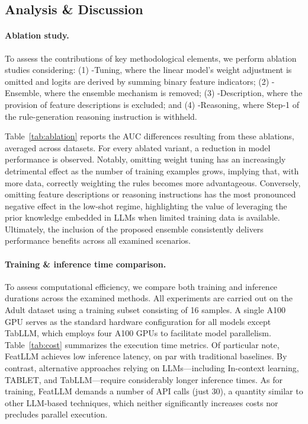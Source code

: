 \subsection{Analysis \& Discussion}
\label{sec:analysis}
\paragraph{Ablation study.} 
To assess the contributions of key methodological elements, we perform ablation studies considering: (1) \textsf{-Tuning}, where the linear model’s weight adjustment is omitted and logits are derived by summing binary feature indicators; (2) \textsf{-Ensemble}, where the ensemble mechanism is removed; (3) \textsf{-Description}, where the provision of feature descriptions is excluded; and (4) \textsf{-Reasoning}, where Step-1 of the rule-generation reasoning instruction is withheld.

Table~\ref{tab:ablation} reports the AUC differences resulting from these ablations, averaged across datasets. For every ablated variant, a reduction in model performance is observed. Notably, omitting weight tuning has an increasingly detrimental effect as the number of training examples grows, implying that, with more data, correctly weighting the rules becomes more advantageous. Conversely, omitting feature descriptions or reasoning instructions has the most pronounced negative effect in the low-shot regime, highlighting the value of leveraging the prior knowledge embedded in LLMs when limited training data is available. Ultimately, the inclusion of the proposed ensemble consistently delivers performance benefits across all examined scenarios.

\vspace*{-0.12in}
\paragraph{Training \& inference time comparison.} To assess computational efficiency, we compare both training and inference durations across the examined methods. All experiments are carried out on the Adult dataset using a training subset consisting of 16 samples. A single A100 GPU serves as the standard hardware configuration for all models except TabLLM, which employs four A100 GPUs to facilitate model parallelism. Table~\ref{tab:cost} summarizes the execution time metrics. Of particular note, \textsf{FeatLLM} achieves low inference latency, on par with traditional baselines. By contrast, alternative approaches relying on LLMs—including In-context learning, TABLET, and TabLLM—require considerably longer inference times. As for training, \textsf{FeatLLM} demands a number of API calls (just 30), a quantity similar to other LLM-based techniques, which neither significantly increases costs nor precludes parallel execution.

